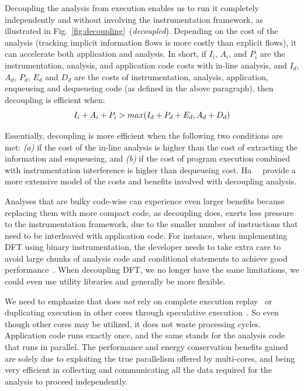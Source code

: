Decoupling the analysis from execution enables us to run it completely
independently and without involving the instrumentation framework, as
illustrated in Fig.~\ref{fig:decoupling}~(\textit{decoupled}). Depending on the
cost of the analysis (\eg tracking implicit information flows is more costly
than explicit flows), it can accelerate both application and analysis.  In
short, if $I_{i}$, $A_{i}$, and $P_{i}$ are the instrumentation, analysis, and
application code costs with in-line analysis, and $I_{d}$, $A_{d}$, $P_{d}$,
$E_{d}$ and $D_{d}$ are the costs of instrumentation, analysis, application,
enqueueing and dequeueing code (as defined in the above paragraph), then
decoupling is efficient when:
\begin{equation} \vspace{-5pt}
	I_{i} + A_{i} + P_{i} > max(I_{d} + P_{d} + E_{d}, A_{d} + D_{d})
	\label{eqn:efficiency}
\end{equation}
\vspace{-8pt}

Essentially, decoupling is more efficient when the following two conditions are
met: \textit{(a)} if the cost of the in-line analysis is higher than the cost of
extracting the information and enqueueing, and \textit{(b)} if the cost of
program execution combined with instrumentation interference is higher than
dequeueing cost.  Ha~\etal~\cite{cab:oopsala2009} provide a more extensive model
of the costs and benefits involved with decoupling analysis.

Analyses that are bulky code-wise can experience even larger benefits because
replacing them with more compact code, as decoupling does, exerts less
pressure to the instrumentation framework, due to the smaller number of
instructions that need to be interleaved with application code.
For instance, when implementing DFT using binary instrumentation, the
developer needs to take extra care to avoid large chunks of analysis code and
conditional statements to achieve good performance~\cite{libdft:2012vee}. When
decoupling DFT, we no longer have the same limitations, we could even use
utility libraries and generally be more flexible.

We need to emphasize that \sreplica does \emph{not} rely on complete execution
replay~\cite{aftersight:atc2008, paranoidandroid:acsac10} or duplicating
execution in other cores through speculative execution~\cite{speck:asplos2008,
superpin:cgo2007}. So even though other cores may be utilized, it does not
waste processing cycles.  Application code runs exactly once, and the same
stands for the analysis code that runs in parallel. The performance and energy
conservation benefits gained are solely due to exploiting the true parallelism
offered by multi-cores, and being very efficient in collecting and
communicating all the data required for the analysis to proceed independently.

